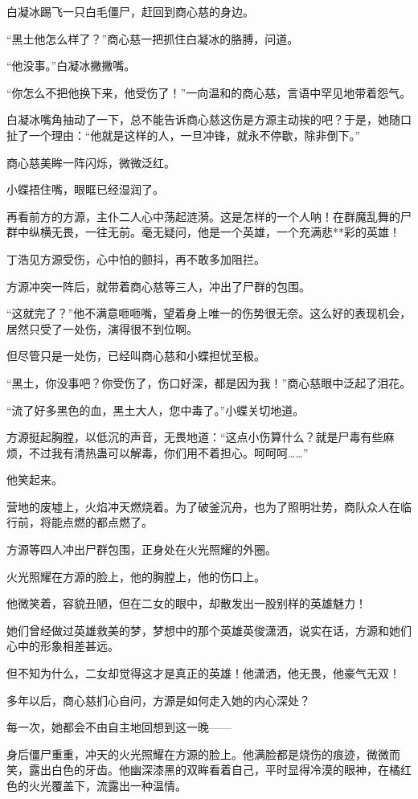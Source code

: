 \begin{this_body}
白凝冰踢飞一只白毛僵尸，赶回到商心慈的身边。

“黑土他怎么样了？”商心慈一把抓住白凝冰的胳膊，问道。

“他没事。”白凝冰撇撇嘴。

“你怎么不把他换下来，他受伤了！”一向温和的商心慈，言语中罕见地带着怨气。

白凝冰嘴角抽动了一下，总不能告诉商心慈这伤是方源主动挨的吧？于是，她随口扯了一个理由：“他就是这样的人，一旦冲锋，就永不停歇，除非倒下。”

商心慈美眸一阵闪烁，微微泛红。

小蝶捂住嘴，眼眶已经湿润了。

再看前方的方源，主仆二人心中荡起涟漪。这是怎样的一个人呐！在群魔乱舞的尸群中纵横无畏，一往无前。毫无疑问，他是一个英雄，一个充满悲**彩的英雄！

丁浩见方源受伤，心中怕的颤抖，再不敢多加阻拦。

方源冲突一阵后，就带着商心慈等三人，冲出了尸群的包围。

“这就完了？”他不满意咂咂嘴，望着身上唯一的伤势很无奈。这么好的表现机会，居然只受了一处伤，演得很不到位啊。

但尽管只是一处伤，已经叫商心慈和小蝶担忧至极。

“黑土，你没事吧？你受伤了，伤口好深，都是因为我！”商心慈眼中泛起了泪花。

“流了好多黑色的血，黑土大人，您中毒了。”小蝶关切地道。

方源挺起胸膛，以低沉的声音，无畏地道：“这点小伤算什么？就是尸毒有些麻烦，不过我有清热蛊可以解毒，你们用不着担心。呵呵呵……”

他笑起来。

营地的废墟上，火焰冲天燃烧着。为了破釜沉舟，也为了照明壮势，商队众人在临行前，将能点燃的都点燃了。

方源等四人冲出尸群包围，正身处在火光照耀的外圈。

火光照耀在方源的脸上，他的胸膛上，他的伤口上。

他微笑着，容貌丑陋，但在二女的眼中，却散发出一股别样的英雄魅力！

她们曾经做过英雄救美的梦，梦想中的那个英雄英俊潇洒，说实在话，方源和她们心中的形象相差甚远。

但不知为什么，二女却觉得这才是真正的英雄！他潇洒，他无畏，他豪气无双！

多年以后，商心慈扪心自问，方源是如何走入她的内心深处？

每一次，她都会不由自主地回想到这一晚——

身后僵尸重重，冲天的火光照耀在方源的脸上。他满脸都是烧伤的痕迹，微微而笑，露出白色的牙齿。他幽深漆黑的双眸看着自己，平时显得冷漠的眼神，在橘红色的火光覆盖下，流露出一种温情。


\end{this_body}

